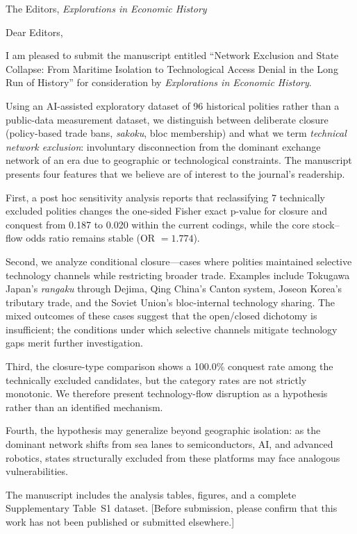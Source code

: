 \documentclass[11pt]{letter}
\begin{document}
\begin{letter}{The Editors, \emph{Explorations in Economic History}}
\opening{Dear Editors,}

I am pleased to submit the manuscript entitled ``Network Exclusion and State Collapse: From Maritime Isolation to Technological Access Denial in the Long Run of History'' for consideration by \emph{Explorations in Economic History}.

Using an AI-assisted exploratory dataset of 96 historical polities rather than a public-data measurement dataset, we distinguish between deliberate closure (policy-based trade bans, \emph{sakoku}, bloc membership) and what we term \emph{technical network exclusion}: involuntary disconnection from the dominant exchange network of an era due to geographic or technological constraints. The manuscript presents four features that we believe are of interest to the journal's readership.

First, a post hoc sensitivity analysis reports that reclassifying 7 technically excluded polities changes the one-sided Fisher exact p-value for closure and conquest from 0.187 to 0.020 within the current codings, while the core stock--flow odds ratio remains stable (OR $= 1.774$).

Second, we analyze conditional closure---cases where polities maintained selective technology channels while restricting broader trade. Examples include Tokugawa Japan's \emph{rangaku} through Dejima, Qing China's Canton system, Joseon Korea's tributary trade, and the Soviet Union's bloc-internal technology sharing. The mixed outcomes of these cases suggest that the open/closed dichotomy is insufficient; the conditions under which selective channels mitigate technology gaps merit further investigation.

Third, the closure-type comparison shows a 100.0\% conquest rate among the technically excluded candidates, but the category rates are not strictly monotonic. We therefore present technology-flow disruption as a hypothesis rather than an identified mechanism.

Fourth, the hypothesis may generalize beyond geographic isolation: as the dominant network shifts from sea lanes to semiconductors, AI, and advanced robotics, states structurally excluded from these platforms may face analogous vulnerabilities.

The manuscript includes the analysis tables, figures, and a complete Supplementary Table~S1 dataset. [Before submission, please confirm that this work has not been published or submitted elsewhere.]


\end{letter}
\end{document}
